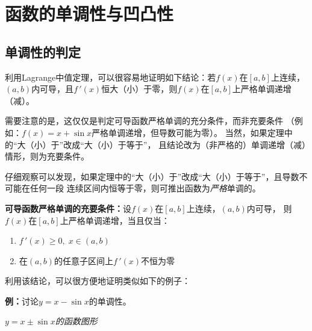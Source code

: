 \section{函数的单调性与凹凸性}

\subsection{单调性的判定}

利用Lagrange中值定理，可以很容易地证明如下结论：若$f(x)$在$[a,b]$上连续，
$(a,b)$内可导，且$f\,'(x)$恒大（小）于零，则$f(x)$在$[a,b]$上严格单调递增（减）。

需要注意的是，这仅仅是判定可导函数严格单调的充分条件，而非充要条件
（例如：$f(x)=x+\sin x$严格单调递增，但导数可能为零）。
当然，如果定理中的“大（小）于”改成“大（小）于等于”，
且结论改为（非严格的）单调递增（减）情形，则为充要条件。

仔细观察可以发现，如果定理中的“大（小）于”改成“大（小）于等于”，且导数不可能在任何一段
连续区间内恒等于零，则可推出函数为{\it 严格}单调的。

\begin{thx}
	{\bf 可导函数严格单调的充要条件：}设$f(x)$在$[a,b]$上连续，$(a,b)$内可导，
	则$f(x)$在$[a,b]$上严格单调递增，当且仅当：
	\begin{enumerate}[(1)]
	  \item $f\,'(x)\geq 0,\;x\in(a,b)$
	  \item 在$(a,b)$的任意子区间上$f\,'(x)$不恒为零
	\end{enumerate}
\end{thx}

利用该结论，可以很方便地证明类似如下的例子：

{\bf 例：}讨论$y=x-\sin x$的单调性。

\begin{center}
	
	{\it $y=x\pm\sin x$的函数图形}
\end{center}

